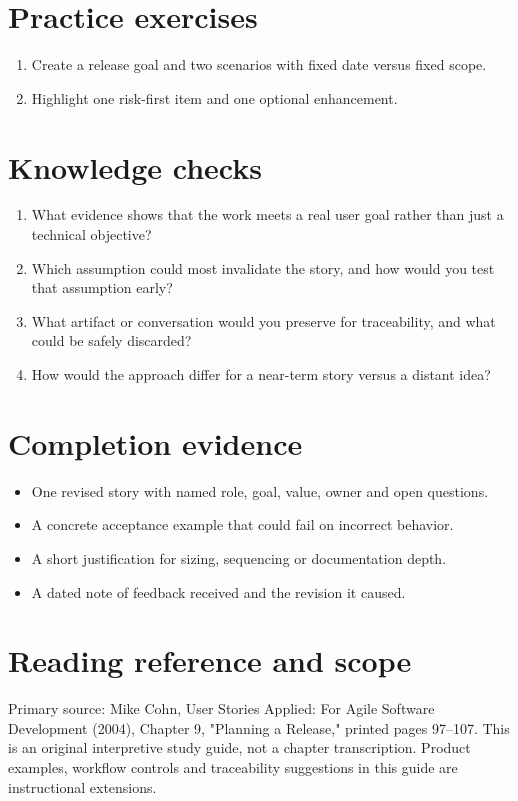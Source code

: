 \documentclass[11pt,letterpaper]{article}
\begin{document}
\section{Practice exercises}
\begin{enumerate}[leftmargin=*,itemsep=3pt]
\item Create a release goal and two scenarios with fixed date versus fixed scope.
\item Highlight one risk-first item and one optional enhancement.
\end{enumerate}
\section{Knowledge checks}
\begin{enumerate}[leftmargin=*,itemsep=3pt]
\item What evidence shows that the work meets a real user goal rather than just a technical objective?
\item Which assumption could most invalidate the story, and how would you test that assumption early?
\item What artifact or conversation would you preserve for traceability, and what could be safely discarded?
\item How would the approach differ for a near-term story versus a distant idea?
\end{enumerate}
\section{Completion evidence}
\begin{itemize}[leftmargin=*,itemsep=2pt]
\item One revised story with named role, goal, value, owner and open questions.
\item A concrete acceptance example that could fail on incorrect behavior.
\item A short justification for sizing, sequencing or documentation depth.
\item A dated note of feedback received and the revision it caused.
\end{itemize}
\section{Reading reference and scope}
Primary source: Mike Cohn, User Stories Applied: For Agile Software Development (2004), Chapter 9, "Planning a Release," printed pages 97–107. This is an original interpretive study guide, not a chapter transcription. Product examples, workflow controls and traceability suggestions in this guide are instructional extensions.
\end{document}
